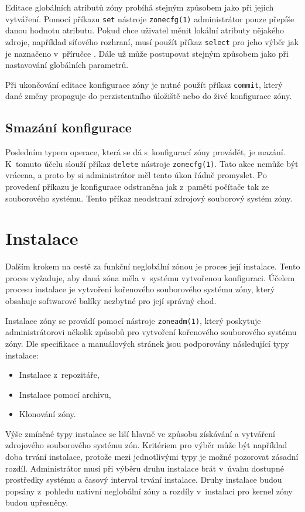 Editace globálních atributů zóny probíhá stejným způsobem jako při jejich vytváření. Pomocí příkazu \verb|set| nástroje
\verb|zonecfg(1)| administrátor pouze přepíše danou hodnotu atributu. Pokud chce uživatel měnit lokální atributy nějakého zdroje,
například síťového rozhraní, musí použít příkaz \verb|select| pro jeho výběr jak je naznačeno v~příručce \cite{oracle:solaris:zones:modify}.
Dále už může postupovat stejným způsobem jako při nastavování globálních parametrů.

Při ukončování editace konfigurace zóny je nutné použít příkaz \verb|commit|, který dané změny propaguje do perzistentního 
úložiště nebo do živé konfigurace zóny.
\subsection{Smazání konfigurace}
\label{chapter:zones:configuration:deleting}
Posledním typem operace, která se dá s~konfigurací zóny provádět, je mazání. K~tomuto účelu slouží příkaz \verb|delete| nástroje
\verb|zonecfg(1)|. Tato akce nemůže být vrácena, a proto by si administrátor měl tento úkon řádně promyslet. Po provedení
příkazu je konfigurace odstraněna jak z~paměti počítače tak ze souborového systému. Tento příkaz neodstraní zdrojový souborový
systém zóny.
\section{Instalace}
\label{chapter:zones:instalation}
Dalším krokem na cestě za funkční neglobální zónou je proces její instalace. Tento proces vyžaduje, aby daná zóna měla
v~systému vytvořenou konfiguraci. Účelem procesu instalace je vytvoření kořenového souborového systému zóny, který obsahuje
softwarové balíky nezbytné pro její správný chod.

Instalace zóny se provádí pomocí nástroje \verb|zoneadm(1)|, který poskytuje administrátorovi několik způsobů
pro vytvoření kořenového souborového systému zóny. Dle specifikace \cite{oracle:solaris:zones:installation} a manuálových stránek
\cite{oracle:manpages:zoneadm} jsou podporovány následující typy instalace:
\begin{itemize}
 \item Instalace z~repozitáře,
 \item Instalace pomocí archivu,
 \item Klonování zóny.
\end{itemize}
Výše zmíněné typy instalace se liší hlavně ve způsobu získávání a vytváření zdrojového souborového systému zón. Kritériem pro
výběr může být například doba trvání instalace, protože mezi jednotlivými typy je možné pozorovat zásadní rozdíl. Administrátor
musí při výběru druhu instalace brát v~úvahu dostupné prostředky systému a časový interval trvání instalace. Druhy instalace
budou popsány z~pohledu nativní neglobální zóny a rozdíly v~instalaci pro kernel zóny budou upřesněny. 
